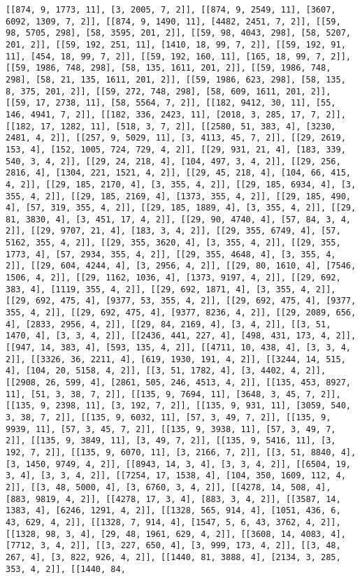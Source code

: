 \documentclass[12pt,fleqn]{article}\usepackage{../../common}
\begin{document}
\begin{verbatim}
[[874, 9, 1773, 11], [3, 2005, 7, 2]], [[874, 9, 2549, 11], [3607, 6092, 1309, 7, 2]], [[874, 9, 1490, 11], [4482, 2451, 7, 2]], [[59, 98, 5705, 298], [58, 3595, 201, 2]], [[59, 98, 4043, 298], [58, 5207, 201, 2]], [[59, 192, 251, 11], [1410, 18, 99, 7, 2]], [[59, 192, 91, 11], [454, 18, 99, 7, 2]], [[59, 192, 160, 11], [165, 18, 99, 7, 2]], [[59, 1986, 748, 298], [58, 135, 1611, 201, 2]], [[59, 1986, 748, 298], [58, 21, 135, 1611, 201, 2]], [[59, 1986, 623, 298], [58, 135, 8, 375, 201, 2]], [[59, 272, 748, 298], [58, 609, 1611, 201, 2]], [[59, 17, 2738, 11], [58, 5564, 7, 2]], [[182, 9412, 30, 11], [55, 146, 4941, 7, 2]], [[182, 336, 2423, 11], [2018, 3, 285, 17, 7, 2]], [[182, 17, 1282, 11], [518, 3, 7, 2]], [[2580, 51, 383, 4], [3230, 2481, 4, 2]], [[257, 9, 5029, 11], [3, 4113, 45, 7, 2]], [[29, 2619, 153, 4], [152, 1005, 724, 729, 4, 2]], [[29, 931, 21, 4], [183, 339, 540, 3, 4, 2]], [[29, 24, 218, 4], [104, 497, 3, 4, 2]], [[29, 256, 2816, 4], [1304, 221, 1521, 4, 2]], [[29, 45, 218, 4], [104, 66, 415, 4, 2]], [[29, 185, 2170, 4], [3, 355, 4, 2]], [[29, 185, 6934, 4], [3, 355, 4, 2]], [[29, 185, 2169, 4], [1373, 355, 4, 2]], [[29, 185, 490, 4], [57, 319, 355, 4, 2]], [[29, 185, 1889, 4], [3, 355, 4, 2]], [[29, 81, 3830, 4], [3, 451, 17, 4, 2]], [[29, 90, 4740, 4], [57, 84, 3, 4, 2]], [[29, 9707, 21, 4], [183, 3, 4, 2]], [[29, 355, 6749, 4], [57, 5162, 355, 4, 2]], [[29, 355, 3620, 4], [3, 355, 4, 2]], [[29, 355, 1773, 4], [57, 2934, 355, 4, 2]], [[29, 355, 4648, 4], [3, 355, 4, 2]], [[29, 604, 4244, 4], [3, 2956, 4, 2]], [[29, 80, 1610, 4], [7546, 1506, 4, 2]], [[29, 1162, 1036, 4], [1373, 9197, 4, 2]], [[29, 692, 383, 4], [1119, 355, 4, 2]], [[29, 692, 1871, 4], [3, 355, 4, 2]], [[29, 692, 475, 4], [9377, 53, 355, 4, 2]], [[29, 692, 475, 4], [9377, 355, 4, 2]], [[29, 692, 475, 4], [9377, 8236, 4, 2]], [[29, 2089, 656, 4], [2833, 2956, 4, 2]], [[29, 84, 2169, 4], [3, 4, 2]], [[3, 51, 1470, 4], [3, 3, 4, 2]], [[2436, 441, 227, 4], [498, 431, 173, 4, 2]], [[947, 14, 383, 4], [593, 135, 4, 2]], [[4711, 10, 438, 4], [3, 3, 4, 2]], [[3326, 36, 2211, 4], [619, 1930, 191, 4, 2]], [[3244, 14, 515, 4], [104, 20, 5158, 4, 2]], [[3, 51, 1782, 4], [3, 4402, 4, 2]], [[2908, 26, 599, 4], [2861, 505, 246, 4513, 4, 2]], [[135, 453, 8927, 11], [51, 3, 38, 7, 2]], [[135, 9, 7694, 11], [3648, 3, 45, 7, 2]], [[135, 9, 2398, 11], [3, 192, 7, 2]], [[135, 9, 931, 11], [3059, 540, 3, 38, 7, 2]], [[135, 9, 6032, 11], [57, 3, 49, 7, 2]], [[135, 9, 9939, 11], [57, 3, 45, 7, 2]], [[135, 9, 3938, 11], [57, 3, 49, 7, 2]], [[135, 9, 3849, 11], [3, 49, 7, 2]], [[135, 9, 5416, 11], [3, 192, 7, 2]], [[135, 9, 6070, 11], [3, 2166, 7, 2]], [[3, 51, 8840, 4], [3, 1450, 9749, 4, 2]], [[8943, 14, 3, 4], [3, 3, 4, 2]], [[6504, 19, 3, 4], [3, 3, 4, 2]], [[7254, 17, 1538, 4], [104, 350, 1609, 112, 4, 2]], [[3, 48, 5000, 4], [3, 6760, 3, 4, 2]], [[4278, 14, 508, 4], [883, 9819, 4, 2]], [[4278, 17, 3, 4], [883, 3, 4, 2]], [[3587, 14, 1383, 4], [6246, 1291, 4, 2]], [[1328, 565, 914, 4], [1051, 436, 6, 43, 629, 4, 2]], [[1328, 7, 914, 4], [1547, 5, 6, 43, 3762, 4, 2]], [[1328, 98, 3, 4], [29, 48, 1961, 629, 4, 2]], [[3608, 14, 4083, 4], [7712, 3, 4, 2]], [[3, 227, 650, 4], [3, 999, 173, 4, 2]], [[3, 48, 267, 4], [3, 822, 926, 4, 2]], [[1440, 81, 3888, 4], [2134, 3, 285, 353, 4, 2]], [[1440, 84, 
\end{verbatim}
\end{document}
